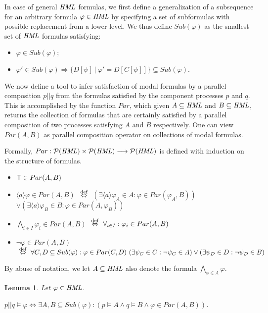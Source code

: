 \documentclass{eptcs}
\def\hml{{\it HML}}
\def\iff{\Leftrightarrow}
\def\iffdef{\stackrel{\rm def}\Leftrightarrow}
\def\implies{\Rightarrow}
\def\true{{\sf T}}
\newtheorem{lemm}{Lemma}
\newenvironment{lemma}{\begin{lemm} \rm }{\end{lemm}}
\newcommand{\diam}[1]{\langle#1\rangle}
\begin{document}
In case of general $\hml$ formulas, we first define a generalization of a subsequence for an arbitrary formula $\varphi \in \hml$ by specifying a set of subformulas with possible replacement from a lower level. We thus define $Sub(\varphi)$ as the smallest set of $\hml$ formulas satisfying:
\begin{itemize}
\item
$\varphi \in Sub(\varphi)$;
\item
$\varphi' \in Sub(\varphi) \implies \{ D[\psi] ~|~ \varphi' = D[C[\psi]] \} \subseteq Sub(\varphi)$.
\end{itemize}

We now define a tool to infer satisfaction of modal formulas by a parallel composition $p||q$ from the formulas satisfied by the component processes $p$ and $q$. This is accomplished by the function $Par$, which given $A\subseteq \hml$ and $B\subseteq \hml$, returns the collection of formulas that are certainly satisfied by a parallel composition of two processes satisfying $A$ and $B$ respectively. One can view $Par(A,B)$ as parallel composition operator on collections of modal formulas.

Formally, $Par: {\cal P}(\hml) \times {\cal P}(\hml) \longrightarrow {\cal P}(\hml)$ is defined with induction on the structure of formulas.
\begin{itemize}
\item $\true \in Par(A,B)$ 
\item $\diam{a} \varphi \in Par(A,B) $
$~\iffdef~$ $( \exists \diam{a} \varphi_A \in A: \varphi \in Par(\varphi_A,B))$
$\vee ( \exists \diam{a} \varphi_B \in B: \varphi \in Par(A,\varphi_B))$
\item $ \bigwedge_{i \in I} \varphi_i \in Par(A,B)$
$~\iffdef~ \forall_{i \in I}: \varphi_i \in Par(A,B)$
\item $\neg \varphi \in Par(A,B)$
$ ~\iffdef~ \forall C,D \subseteq Sub(\varphi): \varphi \in Par(C,D) ~ (\exists \psi_C \in C: \neg \psi_C \in A) \vee (\exists \psi_D \in D: \neg \psi_D \in B)$
\end{itemize}

By abuse of notation, we let $A\subseteq\hml$ also denote the formula $\bigwedge_{\varphi\in A}\varphi$.

\begin{lemma} Let $\varphi \in \hml$.
\label{lem:par}
\begin{center}
$p || q \models \varphi \iff \exists A,B \subseteq Sub(\varphi): (p \models A \wedge q \models B \wedge \varphi \in Par(A,B))$.
\end{center}
\end{lemma}
\end{document}
